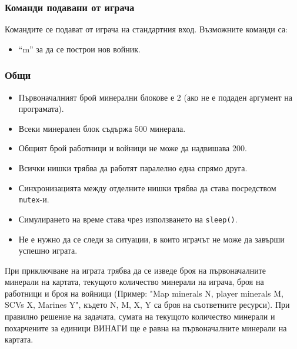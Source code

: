 \documentclass[a4paper,10pt]{article}
\begin{document}
			\subsubsection{Команди подавани от играча}
			Командите се подават от играча на стандартния вход. Възможните команди са:
			\begin{itemize}
				\item ``m'' за да се построи нов войник.
			\end{itemize}
			
			\subsubsection{Общи}
			\begin{itemize}
				\item Първоначалният брой минерални блокове е 2 (ако не е подаден аргумент на програмата).
				\item Всеки минерален блок съдържа 500 минерала.
				\item Общият брой работници и войници не може да надвишава 200.
				\item Всички нишки трябва да работят паралелно една спрямо друга.
				\item Синхронизацията между отделните нишки трябва да става посредством \verb|mutex|-и.
				\item Симулирането на време става чрез използването на \verb|sleep()|.
				\item Не е нужно да се следи за ситуации, в които играчът не може да завърши успешно играта.
			\end{itemize}
			
			При приключване на играта трябва да се изведе броя на първоначалните минерали на картата, текущото количество минерали на играча, броя на работници и броя на войници (Пример: "Map minerals N, player minerals M, SCVs X, Marines Y", където N, M, X, Y са броя на съответните ресурси). При правилно решение на задачата, сумата на текущото количество минерали и похарчените за единици ВИНАГИ ще е равна на първоначалните минерали на картата.
			
\end{document}

